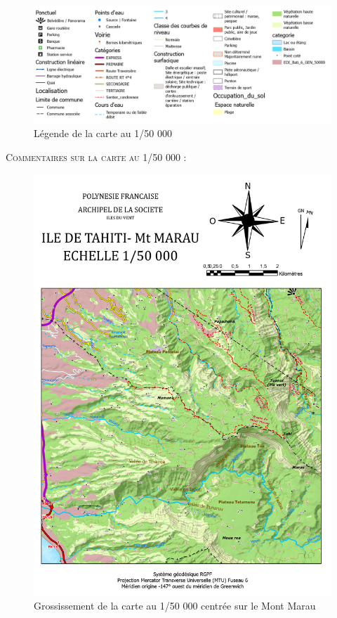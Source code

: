 \documentclass{themeensg}
\begin{document}
\begin{appendices}
\begin{figure}[!h]
\centering
\includegraphics[width=\linewidth]{images/Annexes/Resultat/legende_50.png}
\caption{Légende de la carte au 1/50 000}
\label{15000_legende}
\end{figure}

\vspace{3cm}
\textsc{Commentaires sur la carte au 1/50 000 :}\\

\begin{figure}[!h]
\centering
\includegraphics[width=\linewidth]{images/Annexes/Resultat/Carte_50000_A4.pdf}
\caption{Grossissement de la carte au 1/50 000 centrée sur le Mont Marau}
\label{15000_gros}
\end{figure}


\end{appendices}
\end{document}
